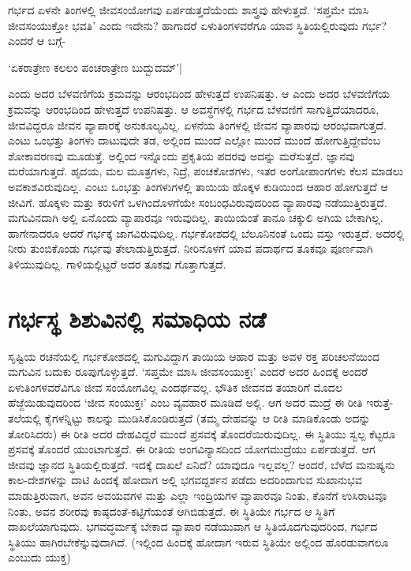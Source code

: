 ಗರ್ಭದ ಏಳನೇ ತಿಂಗಳಲ್ಲಿ ಜೀವಸಂಯೋಗವು ಏರ್ಪಡುತ್ತದೆಯೆಂದು ಶಾಸ್ತ್ರವು ಹೇಳುತ್ತದೆ. `ಸಪ್ತಮೇ ಮಾಸಿ ಜೀವಸಂಯುಕ್ತೋ ಭವತಿ' ಎಂದು ಇದೇನು? ಹಾಗಾದರೆ ಏಳುತಿಂಗಳವರೆಗೂ ಯಾವ ಸ್ಥಿತಿಯಲ್ಲಿರುವುದು ಗರ್ಭ? ಎಂದರೆ ಆ ಬಗ್ಗೆ-

\begin{shloka}
`ಏಕರಾತ್ರೇಣ ಕಲಲಂ ಪಂಚರಾತ್ರೇಣ ಬುದ್ಬುದಮ್'|\label{85}
\end{shloka}
ಎಂದು ಅದರ ಬೆಳವಣಿಗೆಯ ಕ್ರಮವನ್ನು  ಆರಂಭದಿಂದ ಹೇಳುತ್ತದೆ ಉಪನಿಷತ್ತು. ಆ ಎಂದು ಅದರ ಬೆಳವಣಿಗೆಯ ಕ್ರಮವನ್ನು ಆರಂಭದಿಂದ ಹೇಳುತ್ತದೆ ಉಪನಿಷತ್ತು. ಆ ಅವಸ್ಥೆಗಳಲ್ಲಿ ಗರ್ಭದ ಬೆಳವಣಿಗೆ ಸಾಗುತ್ತಿದೆಯಾದರೂ, ಜೀವವಿದ್ದರೂ ಜೀವನ ವ್ಯಾಪಾರಕ್ಕೆ ಅನುಕೂಲ್ಯವಿಲ್ಲ. ಏಳನೆಯ ತಿಂಗಳಲ್ಲಿ ಜೀವನ ವ್ಯಾಪಾರವು ಆರಂಭವಾಗುತ್ತದೆ. ಎಂಟು ಒಂಭತ್ತು ತಿಂಗಳು ದಾಟುವುದೇ ತಡ, ಅಲ್ಲಿಂದ ಮುಂದೆ ಎಲ್ಲೋ ಮುಂದೆ ಮುಂದೆ ಹೋಗುತ್ತಿದ್ದೇವೆಂಬ ಶೋಕಾವರಣವು ಮೂಡುತ್ತೆ. ಅಲ್ಲಿಂದ ಇನ್ನೊಂದು ಪ್ರಕೃತಿಯ ಪದರವು ಅದನ್ನು ಮರೆಸುತ್ತದೆ. ಜ್ಞಾನವು ಮರೆಯಾಗುತ್ತದೆ. ಹೃದಯ, ಮಲ ಮೂತ್ರಗಳು, ನಿದ್ರೆ, ಪಂಚಕೋಶಗಳು, ಇತರ ಅಂಗೋಪಾಂಗಗಳು ಕೆಲಸ ಮಾಡಲು ಅವಕಾಶವಿರುವುದಿಲ್ಲ. ಎಂಟು ಒಂಭತ್ತು ತಿಂಗಳುಗಳಲ್ಲಿ ತಾಯಿಯ ಹೊಕ್ಕಳ ಕುಡಿಯಿಂದ ಆಹಾರ ಹೋಗುತ್ತದೆ ಆ ಜೀವಿಗೆ. ಹೊಕ್ಕಳು ಮತ್ತು ಕರುಳಿಗೆ ಒಳಗಿಂದೊಳಗೆಯೇ ಸಂಬಂಧವಿರುವುದರಿಂದ ವ್ಯಾಪಾರವು ನಡೆಯುತ್ತಿರುತ್ತದೆ. ಮಗುವಿನದಾಗಿ ಅಲ್ಲಿ ಏನೊಂದು ವ್ಯಾಪಾರವೂ ಇರುವುದಿಲ್ಲ. ತಾಯಿಯಂತೆ ತಾನೂ ಚಕ್ಕುಲಿ ಅಗಿಯ ಬೇಕಾಗಿಲ್ಲ. ಹಾಗೇನಾದರೂ ಆದರೆ ಗರ್ಭಕ್ಕೆ ಜಾಗವಿರುವುದಿಲ್ಲ. ಗರ್ಭಕೋಶದಲ್ಲಿ ಬೆಲೂನಿನಂತೆ ಒಂದು ವಸ್ತು ಇರುತ್ತದೆ. ಅದರಲ್ಲಿ ನೀರು ತುಂಬಿಕೊಂಡು ಗರ್ಭವು ತೇಲಾಡುತ್ತಿರುತ್ತದೆ. ನೀರಿನೊಳಗೆ ಯಾವ ಪದಾರ್ಥದ ತೂಕವೂ ಪೂರ್ಣವಾಗಿ ತಿಳಿಯುವುದಿಲ್ಲ. ಗಾಳಿಯಲ್ಲಿಟ್ಟರೆ ಅದರ ತೂಕವು ಗೊತ್ತಾಗುತ್ತದೆ.

\section*{ಗರ್ಭಸ್ಥ ಶಿಶುವಿನಲ್ಲಿ ಸಮಾಧಿಯ ನಡೆ}

ಸೃಷ್ಟಿಯ ರಚನೆಯಲ್ಲಿ ಗರ್ಭಕೋಶದಲ್ಲಿ ಮಗುವಿದ್ದಾಗ ತಾಯಿಯ ಆಹಾರ ಮತ್ತು ಅವಳ ರಕ್ತ ಪರಿಚಲನೆಯಿಂದ ಮಗುವಿನ ಬದುಕು ರೂಪುಗೊಳ್ಳುತ್ತದೆ. `ಸಪ್ತಮೇ ಮಾಸಿ ಜೀವಸಂಯುಕ್ತಃ' ಎಂದರೆ ಅದರ ಹಿಂದಕ್ಕೆ ಅಂದರೆ ಏಳುತಿಂಗಳವರೆವಿಗೂ ಜೀವ ಸಂಯೋಗವಿಲ್ಲ ಎಂದರ್ಥವಲ್ಲ. ಭೌತಿಕ ಜೀವನದ ತಯಾರಿಗೆ ಮೊದಲ ಹೆಜ್ಜೆಯಿಡುವುದರಿಂದ `ಜೀವ ಸಂಯುಕ್ತಃ' ಎಂಬ ವ್ಯವಹಾರ ಮೂಡಿದೆ ಅಲ್ಲಿ. ಆಗ ಅದರ ಮುದ್ರೆ ಈ ರೀತಿ ಇರುತ್ತೆ- ತಲೆಯಲ್ಲಿ ಕೈಗಳನ್ನಿಟ್ಟು ಕಾಲನ್ನು ಮುಡಿಸಿಕೊಂಡಿರುತ್ತದೆ (ತಮ್ಮ ದೇಹವನ್ನು ಆ ರೀತಿ ಮಾಡಿಕೊಂಡು ಅದನ್ನು ತೋರಿಸಿದರು) ಈ ರೀತಿ ಅದರ ದೇಹವಿದ್ದರೆ ಮುಂದೆ ಪ್ರಸವಕ್ಕೆ ತೊಂದರೆಯಿರುವುದಿಲ್ಲ. ಈ ಸ್ಥಿತಿಯು ಸ್ವಲ್ಪ ಕೆಟ್ಟರೂ ಪ್ರಸವಕ್ಕೆ ತೊಂದರೆ ಯುಂಟಾಗುತ್ತದೆ. ಈ ರೀತಿಯ ಅಂಗವಿನ್ಯಾಸದಿಂದ ಯೋಗಮುದ್ರೆಯು ಏರ್ಪಡುತ್ತದೆ. ಆಗ ಜೀವವು ಜ್ಞಾನದ ಸ್ಥಿತಿಯಲ್ಲಿರುತ್ತದೆ. ಇದಕ್ಕೆ ದಾಖಲೆ ಏನಿದೆ? ಯಾವುದೂ ಇಲ್ಲವಲ್ಲ? ಅಂದರೆ, ಬೆಳೆದ ಮನುಷ್ಯನು ಕಾಲ-ದೇಶಗಳನ್ನು ದಾಟಿ ಹಿಂದಕ್ಕೆ ಹೋದಾಗ ಅಲ್ಲಿ ಭಗವದ್ದರ್ಶನ ಪಡೆದು ಅದರಿಂದಾಗುವ ಸುಖಾನುಭವ ಮಾಡುತ್ತಿರುವಾಗ, ಅವನ ಅವಯವಗಳ ಮತ್ತು ಎಲ್ಲಾ ಇಂದ್ರಿಯಗಳ ವ್ಯಾಪಾರವೂ ನಿಂತು, ಕೊನೆಗೆ ಉಸಿರಾಟವೂ ನಿಂತು, ಅವನ ಶರೀರವು ಕಾಷ್ಠದಂತೆ-ಕಟ್ಟಿಗೆಯಂತೆ ಆಗಿಬಿಡುತ್ತದೆ. ಈ ಸ್ಥಿತಿಯೇ ಗರ್ಭದ ಆ ಸ್ಥಿತಿಗೆ ದಾಖಲೆಯಾಗುವುದು. ಭಗವದ್ಧರ್ಮಕ್ಕೆ ಬೇಕಾದ ವ್ಯಾಪಾರ ನಡೆಯುವಾಗ ಆ ಸ್ಥಿತಿಯೊದಗುವುದರಿಂದ, ಗರ್ಭದ ಸ್ಥಿತಿಯು ಹಾಗಿರಬೇಕೆನ್ನುವುದಾಗಿದೆ. (ಇಲ್ಲಿಂದ ಹಿಂದಕ್ಕೆ ಹೋದಾಗ ಇರುವ ಸ್ಥಿತಿಯೇ ಅಲ್ಲಿಂದ ಹೊರಡುವಾಗಲೂ ಎಂಬುದು ಯುಕ್ತ)

